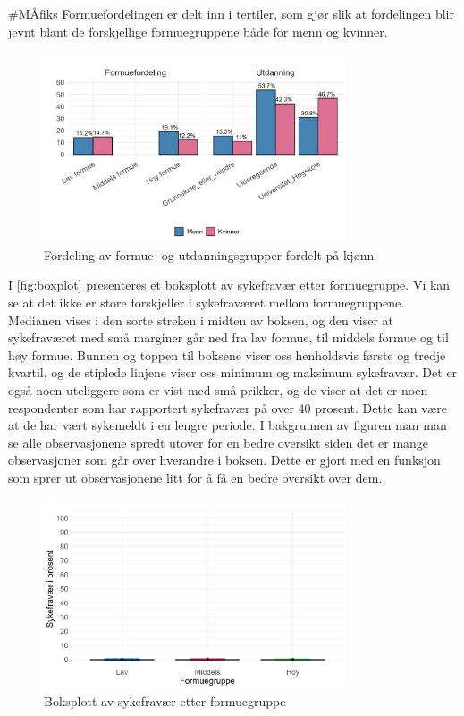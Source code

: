 \documentclass[
  12pt,
  a4paper,
  DIV=11,
  numbers=noendperiod]{scrartcl}
\begin{document}
\#MÅfiks Formuefordelingen er delt inn i tertiler, som gjør slik at
fordelingen blir jevnt blant de forskjellige formuegruppene både for
menn og kvinner.

\begin{figure}[H]
\caption{Fordeling av formue- og utdanningsgrupper fordelt på kjønn}
\label{fig:barplot_2}
\centering
\includegraphics[width=0.8\textwidth]{dokumentobjekter/figurer/fig_5.png}
\end{figure}

I \autoref{fig:boxplot} presenteres et boksplott av sykefravær etter
formuegruppe. Vi kan se at det ikke er store forskjeller i sykefraværet
mellom formuegruppene. Medianen vises i den sorte streken i midten av
boksen, og den viser at sykefraværet med små marginer går ned fra lav
formue, til middels formue og til høy formue. Bunnen og toppen til
boksene viser oss henholdsvis første og tredje kvartil, og de stiplede
linjene viser oss minimum og maksimum sykefravær. Det er også noen
uteliggere som er vist med små prikker, og de viser at det er noen
respondenter som har rapportert sykefravær på over 40 prosent. Dette kan
være at de har vært sykemeldt i en lengre periode. I bakgrunnen av
figuren man man se alle observasjonene spredt utover for en bedre
oversikt siden det er mange observasjoner som går over hverandre i
boksen. Dette er gjort med en funksjon som sprer ut observasjonene litt
for å få en bedre oversikt over dem.

\begin{figure}[H]
\caption{Boksplott av sykefravær etter formuegruppe}
\label{fig:boxplot}
\centering
\includegraphics[width=0.8\textwidth]{dokumentobjekter/figurer/fig_6.png}
\end{figure}
\end{document}
